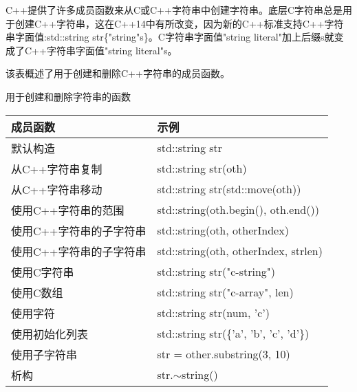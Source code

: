 C++提供了许多成员函数来从C或C++字符串中创建字符串。底层C字符串总是用于创建C++字符串，这在C++14中有所改变，因为新的C++标准支持C++字符串字面值:std::string str\{"string"s\}。C字符串字面值"string literal"加上后缀s就变成了C++字符串字面值"string literal"s。

该表概述了用于创建和删除C++字符串的成员函数。

\begin{center}
用于创建和删除字符串的函数
\end{center}

\begin{longtable}[c]{|l|l|}
\hline
\textbf{成员函数}        & \textbf{示例}                        \\ \hline
\endfirsthead
%
\endhead
%
默认构造                          & std::string str                         \\ \hline
从C++字符串复制         & std::string str(oth)                    \\ \hline
从C++字符串移动          & std::string str(std::move(oth))         \\ \hline
使用C++字符串的范围   & std::string(oth.begin(), oth.end())     \\ \hline
使用C++字符串的子字符串 & std::string(oth, otherIndex)            \\ \hline
使用C++字符串的子字符串 & std::string(oth, otherIndex, strlen)    \\ \hline
使用C字符串                  & std::string str("c-string")             \\ \hline
使用C数组                  & std::string str("c-array", len)         \\ \hline
使用字符                  & std::string str(num, 'c')               \\ \hline
使用初始化列表         & std::string str(\{'a', 'b', 'c', 'd'\}) \\ \hline
使用子字符串                 & str = other.substring(3, 10)            \\ \hline
析构                       & str.$\sim$string()                      \\ \hline
\end{longtable}


